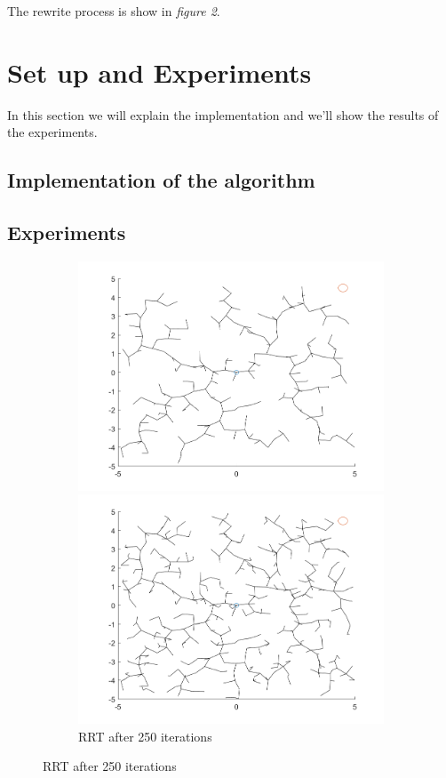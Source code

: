 \documentclass[10pt]{article}
\begin{document}
	The rewrite process is show in \textit{figure 2}.

	
	\section{Set up and Experiments}
	In this section we will explain the implementation and we'll show the results of the experiments.
	\subsection{Implementation of the algorithm}
	\subsection{Experiments}
	
	
\begin{figure}
	\begin{subfigure}{\textwidth}
		\centering
		\begin{minipage}[b]{0.32\linewidth}
		\includegraphics[width=\linewidth]{empty_250_dist_0}
		\caption{RRT after 250 iterations}
	\end{minipage}
		\begin{minipage}[b]{0.32\linewidth}
		\includegraphics[width=\linewidth]{empty_500_dist_0}

\end{minipage}
\end{subfigure}
\end{figure}
\end{document}
